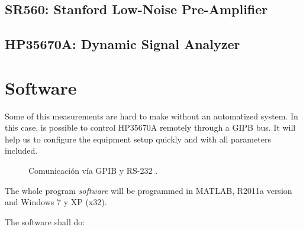 \subsection{SR560: Stanford Low-Noise Pre-Amplifier}
\subsection{HP35670A: Dynamic Signal Analyzer}


\section{Software}

Some of this measurements are hard to make without an automatized system. In this case, is possible to control HP35670A remotely through a GIPB bus. It will help us to configure the equipment setup quickly and with all parameters included.

\begin{figure}[H]%
\noindent \begin{centering}
\hspace{0.5cm}
\vspace{0.1cm}
\bigskip
\caption{\label{fig:gpib_and_rs232_cap2} Comunicación vía GPIB y RS-232 \cite{WIKIPED}.}
\par\end{centering}
\end{figure}


The whole program \textit{software} will be programmed in MATLAB\textsuperscript{\textregistered},  R2011a version and Windows 7 y XP (x32).

The software shall do:

